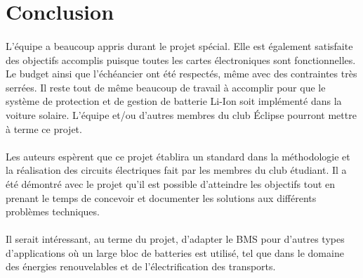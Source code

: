\section{Conclusion}

	\paragraph{}
	L'équipe a beaucoup appris durant le projet spécial. Elle est également satisfaite des objectifs accomplis puisque toutes les cartes électroniques sont fonctionnelles. Le budget ainsi que l'échéancier ont été respectés, même avec des contraintes très serrées. Il reste tout de même beaucoup de travail à accomplir pour que le système de protection et de gestion de batterie Li-Ion soit implémenté dans la voiture solaire. L'équipe et/ou d'autres membres du club Éclipse pourront mettre à terme ce projet.
	
	\paragraph{}
	 Les auteurs espèrent que ce projet établira un standard dans la méthodologie et la réalisation des circuits électriques fait par les membres du club étudiant. Il a été démontré avec le projet qu'il est possible d'atteindre les objectifs tout en prenant le temps de concevoir et documenter les solutions aux différents problèmes techniques. 

	\paragraph{}	
	Il serait intéressant, au terme du projet, d'adapter le BMS pour d'autres types d'applications où un large bloc de batteries est utilisé, tel que dans le domaine des énergies renouvelables et de l'électrification des transports. 